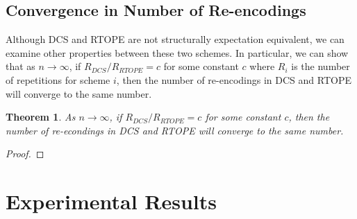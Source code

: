 \documentclass[12pt]{article}
\newtheorem{theorem}{Theorem}
\begin{document}
\subsection{Convergence in Number of Re-encodings}

Although DCS and RTOPE are not structurally expectation equivalent, we can examine other properties between these two schemes. In particular, we can show that as $n \to \infty$, if $R_{DCS} / R_{RTOPE} = c$ for some constant $c$ where $R_{i}$ is the number of repetitions for scheme $i$, then the number of re-encodings in DCS and RTOPE will converge to the same number. 
\begin{theorem}
    As $n \to \infty$, if $R_{DCS} / R_{RTOPE} = c$ for some constant $c$, then the number of re-econdings in DCS and RTOPE will converge to the same number.
  \end{theorem}
  \begin{proof}
  \end{proof}

\section{Experimental Results}
\end{document}
